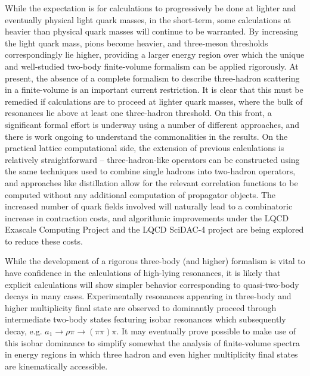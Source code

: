 While the expectation is for calculations to progressively be done at lighter and eventually physical light quark masses, in the short-term, some calculations at heavier than physical quark masses will continue to be warranted. By increasing the light quark mass, pions become heavier, and three-meson thresholds correspondingly lie higher, providing a larger energy region over which the unique and well-studied two-body finite-volume formalism can be applied rigorously. 
At present, the absence of a complete formalism to describe three-hadron scattering in a finite-volume is an important current restriction. It is clear that this must be remedied if calculations are to proceed at lighter quark masses, where the bulk of resonances lie above at least one three-hadron threshold. On this front, a significant formal effort is underway \cite{Polejaeva:2012ut,Hansen:2015zga,Hansen:2014eka,Briceno:2018aml,Doring:2018xxx} using a number of different approaches, and there is work ongoing to understand the commonalities in the results. On the practical lattice computational side, the extension of previous calculations is relatively straightforward -- three-hadron-like operators can be constructed using the same techniques used to combine single hadrons into two-hadron operators, and approaches like distillation \cite{Peardon:2009gh} allow for the relevant correlation functions to be computed without any additional computation of propagator objects. The increased number of quark fields involved will naturally lead to a combinatoric increase in contraction costs, and algorithmic improvements under the LQCD Exascale Computing Project and the LQCD SciDAC-4 project are being explored to reduce these costs.

While the development of a rigorous three-body (and higher) formalism is vital to have confidence in the calculations of high-lying resonances, it is likely that explicit calculations will show simpler behavior corresponding to quasi-two-body decays in many cases. Experimentally resonances appearing in three-body and higher multiplicity final state are observed to dominantly proceed through intermediate two-body states featuring isobar resonances which subsequently decay, e.g. $a_1 \to \rho \pi \to (\pi\pi) \pi$. It may eventually prove possible to make use of this isobar dominance to simplify somewhat the analysis of finite-volume spectra in energy regions in which three hadron and even higher multiplicity final states are kinematically accessible.


